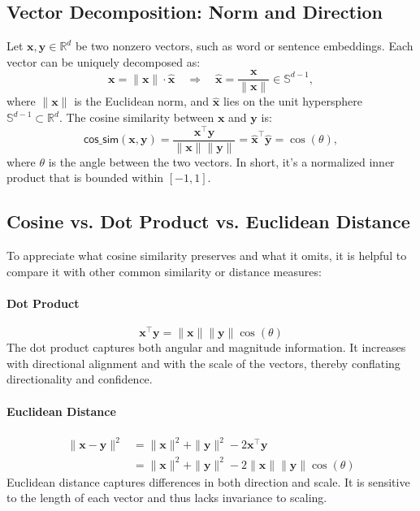 \documentclass[11pt]{article}
\newcommand{\cossim}{\textsf{cos\_sim}}
\begin{document}
\subsection{Vector Decomposition: Norm and Direction}

Let $\mathbf{x}, \mathbf{y} \in \mathbb{R}^d$ be two nonzero vectors, such as word or sentence embeddings. Each vector can be uniquely decomposed as:
\begin{equation*}
	\mathbf{x} = \|\mathbf{x}\| \cdot \hat{\mathbf{x}} \quad \Longrightarrow\quad \hat{\mathbf{x}} = \frac{\mathbf{x}}{\|\mathbf{x}\|} \in \mathbb{S}^{d-1},
\end{equation*}
where $\|\mathbf{x}\|$ is the Euclidean norm, and $\hat{\mathbf{x}}$ lies on the unit hypersphere $\mathbb{S}^{d-1} \subset \mathbb{R}^d$. The cosine similarity between $\mathbf{x}$ and $\mathbf{y}$ is:
\begin{equation*}
	\cossim(\mathbf{x}, \mathbf{y}) = \frac{\mathbf{x}^\top \mathbf{y}}{\|\mathbf{x}\| \|\mathbf{y}\|} = \hat{\mathbf{x}}^\top \hat{\mathbf{y}} = \cos(\theta),
\end{equation*}
where $\theta$ is the angle between the two vectors. In short, it’s a normalized inner product that is bounded within $[-1,1]$.

\subsection{Cosine vs. Dot Product vs. Euclidean Distance}

To appreciate what cosine similarity preserves and what it omits, it is helpful to compare it with other common similarity or distance measures:

\paragraph{Dot Product}
\begin{equation*}
	\mathbf{x}^\top \mathbf{y} = \|\mathbf{x}\| \|\mathbf{y}\| \cos(\theta)
\end{equation*}
The dot product captures both angular and magnitude information. It increases with directional alignment and with the scale of the vectors, thereby conflating directionality and confidence.

\paragraph{Euclidean Distance}
\begin{align*}
	\|\mathbf{x} - \mathbf{y}\|^2 &= \|\mathbf{x}\|^2 + \|\mathbf{y}\|^2 - 2 \mathbf{x}^\top \mathbf{y} \\
	&= \|\mathbf{x}\|^2 + \|\mathbf{y}\|^2 - 2 \|\mathbf{x}\| \|\mathbf{y}\| \cos(\theta)
\end{align*}
Euclidean distance captures differences in both direction and scale. It is sensitive to the length of each vector and thus lacks invariance to scaling.
\end{document}
